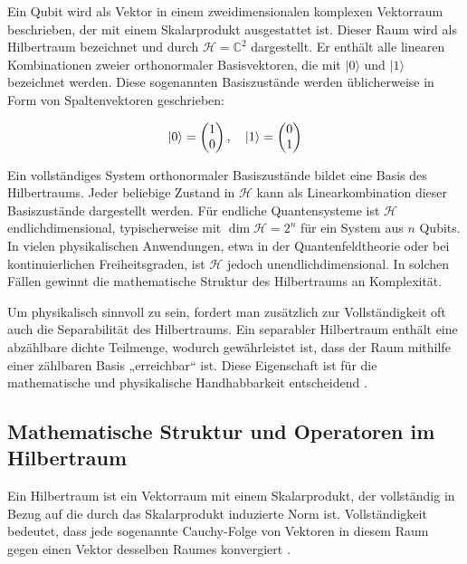 Ein Qubit wird als Vektor in einem zweidimensionalen komplexen Vektorraum beschrieben, der mit einem Skalarprodukt ausgestattet ist. Dieser Raum wird als Hilbertraum bezeichnet und durch \( \mathcal{H} = \mathbb{C}^2 \) dargestellt. Er enthält alle linearen Kombinationen zweier orthonormaler Basisvektoren, die mit \( |0\rangle \) und \( |1\rangle \) bezeichnet werden. Diese sogenannten Basiszustände werden üblicherweise in Form von Spaltenvektoren geschrieben:

\[
\ket{0} = \begin{pmatrix} 1 \\ 0 \end{pmatrix}, \quad \ket{1} = \begin{pmatrix} 0 \\ 1 \end{pmatrix}
\]

Ein vollständiges System orthonormaler Basiszustände bildet eine Basis des Hilbertraums. Jeder beliebige Zustand in \( \mathcal{H} \) kann als Linearkombination dieser Basiszustände dargestellt werden. Für endliche Quantensysteme ist \( \mathcal{H} \) endlichdimensional, typischerweise mit \( \dim \mathcal{H} = 2^n \) für ein System aus \( n \) Qubits. In vielen physikalischen Anwendungen, etwa in der Quantenfeldtheorie oder bei kontinuierlichen Freiheitsgraden, ist \( \mathcal{H} \) jedoch unendlichdimensional. In solchen Fällen gewinnt die mathematische Struktur des Hilbertraums an Komplexität.

Um physikalisch sinnvoll zu sein, fordert man zusätzlich zur Vollständigkeit oft auch die Separabilität des Hilbertraums. Ein separabler Hilbertraum enthält eine abzählbare dichte Teilmenge, wodurch gewährleistet ist, dass der Raum mithilfe einer zählbaren Basis „erreichbar“ ist. Diese Eigenschaft ist für die mathematische und physikalische Handhabbarkeit entscheidend \cite{nolting_springer_2013}.  %

\subsection{Mathematische Struktur und Operatoren im Hilbertraum}
\label{subsec:Mathematische Struktur und Operatoren im Hilbertraum}

Ein Hilbertraum ist ein Vektorraum mit einem Skalarprodukt, der vollständig in Bezug auf die durch das Skalarprodukt induzierte Norm ist. Vollständigkeit bedeutet, dass jede sogenannte Cauchy-Folge von Vektoren in diesem Raum gegen einen Vektor desselben Raumes konvergiert \cite{nolting_springer_2013}.

